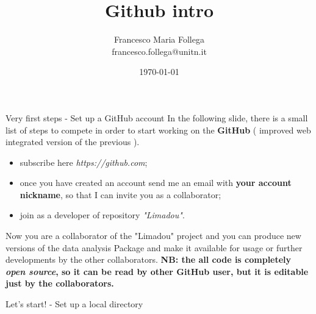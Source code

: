\documentclass[9pt]{beamer}
\title{ Github intro }
\author{\Large Francesco Maria Follega \\{\small francesco.follega@unitn.it}}
\date{\today}
\institute[]{\texttt{[image: logo\_TU]}}
\begin{document}
\begin{frame}
	\maketitle
\end{frame}

\begin{frame}{Very first steps - Set up a GitHub account}
In the following slide, there is a small list of steps to compete in order to start working on the \textbf{GitHub} ( improved web integrated version of the previous  ).
\begin{itemize}
\item subscribe here \textit{https://github.com};
\item once you have created an account send me an email with \textbf{your account nickname}, so that I can invite you as a collaborator;
\item join as a developer of repository \textit{"Limadou"}.
\end{itemize}
Now you are a collaborator of the "Limadou" project and you can produce new versions of the data analysis Package and make it available for usage or further developments by the other collaborators. \newline \newline
\textbf{NB: the all code is completely \textit{open source}, so it can be read by other GitHub user, but it is editable just by the collaborators.}

\end{frame}

\begin{frame}{Let's start! - Set up a local directory}
\item 
\end{frame}
\end{document}
